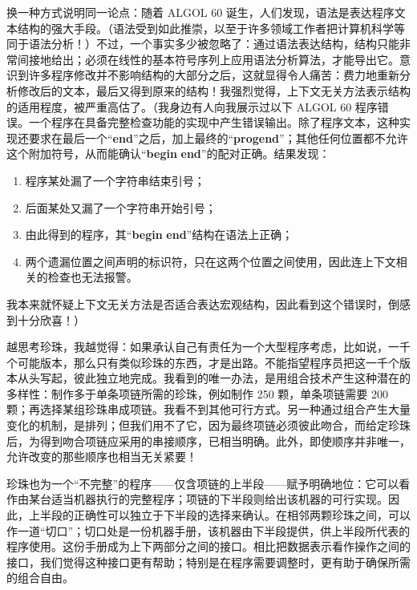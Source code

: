 \documentclass[twoside,11pt,fontset=none]{ctexbook}
\begin{document}
换一种方式说明同一论点：随着 ALGOL 60 诞生，人们发现，语法是表达程序文本结构的强大手段。（语法受到如此推崇，以至于许多领域工作者把计算机科学等同于语法分析！）不过，一个事实多少被忽略了：通过语法表达结构，结构只能非常间接地给出；必须在线性的基本符号序列上应用语法分析算法，才能导出它。意识到许多程序修改并不影响结构的大部分之后，这就显得令人痛苦：费力地重新分析修改后的文本，最后又得到原来的结构！我强烈觉得，上下文无关方法表示结构的适用程度，被严重高估了。（我身边有人向我展示过以下 ALGOL 60 程序错误。一个程序在具备完整检查功能的实现中产生错误输出。除了程序文本，这种实现还要求在最后一个“\textbf{end}”之后，加上最终的“\textbf{progend}”；其他任何位置都不允许这个附加符号，从而能确认“\textbf{begin} \textendash  \textbf{end}”的配对正确。结果发现：

\begin{enumerate}[wide, nosep, label=(\arabic*)]
	\item 程序某处漏了一个字符串结束引号；
	
	\item 后面某处又漏了一个字符串开始引号；
	
	\item 由此得到的程序，其“\textbf{begin} \textendash  \textbf{end}”结构在语法上正确；
	
	\item 两个遗漏位置之间声明的标识符，只在这两个位置之间使用，因此连上下文相关的检查也无法报警。
\end{enumerate}

\noindent
我本来就怀疑上下文无关方法是否适合表达宏观结构，因此看到这个错误时，倒感到十分欣喜！）

越思考珍珠，我越觉得：如果承认自己有责任为一个大型程序考虑，比如说，一千个可能版本，那么只有类似珍珠的东西，才是出路。不能指望程序员把这一千个版本从头写起，彼此独立地完成。我看到的唯一办法，是用组合技术产生这种潜在的多样性：制作多于单条项链所需的珍珠，例如制作 250 颗，单条项链需要 200 颗；再选择某组珍珠串成项链。我看不到其他可行方式。另一种通过组合产生大量变化的机制，是排列；但我们用不了它，因为最终项链必须彼此吻合，而给定珍珠后，为得到吻合项链应采用的串接顺序，已相当明确。此外，即使顺序并非唯一，允许改变的那些顺序也相当无关紧要！

珍珠也为一个“不完整”的程序——仅含项链的上半段——赋予明确地位：它可以看作由某台适当机器执行的完整程序；项链的下半段则给出该机器的可行实现。因此，上半段的正确性可以独立于下半段的选择来确认。在相邻两颗珍珠之间，可以作一道“切口”；切口处是一份机器手册，该机器由下半段提供，供上半段所代表的程序使用。这份手册成为上下两部分之间的接口。相比把数据表示看作操作之间的接口，我们觉得这种接口更有帮助；特别是在程序需要调整时，更有助于确保所需的组合自由。
\end{document}
